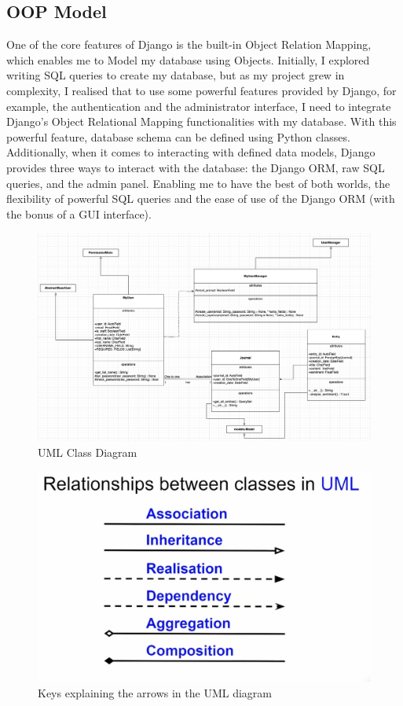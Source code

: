 \subsection{OOP Model}
One of the core features of Django is the built-in Object Relation Mapping, which enables me to Model my database using Objects. Initially, I explored writing SQL queries to create my database, but as my project grew in complexity, I realised that to use some powerful features provided by Django, for example, the authentication and the administrator interface, I need to integrate Django's Object Relational Mapping functionalities with my database. With this powerful feature, database schema can be defined using Python classes. Additionally, when it comes to interacting with defined data models, Django provides three ways to interact with the database: the Django ORM, raw SQL queries, and the admin panel. Enabling me to have the best of both worlds, the flexibility of powerful SQL queries and the ease of use of the Django ORM (with the bonus of a GUI interface).


\begin{figure}[!hbt]
    \centering
    \includegraphics[width=\linewidth]{Assets/UML.png}
    \caption{UML Class Diagram}
    \label{fig:UML}
\end{figure}

\begin{figure}
    \centering
    \includegraphics[width=\linewidth]{Assets/UML_keys.png}
    \caption{Keys explaining the arrows in the UML diagram \cite{carnes2021uml}}
\end{figure}

